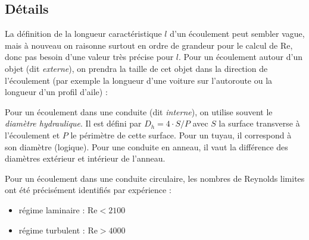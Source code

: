 \subsection{Détails}\label{sec:Re_details}
La définition de la longueur caractéristique $l$ d'un écoulement peut sembler vague, mais à nouveau on raisonne surtout en ordre de grandeur pour le calcul de $\mathrm{Re}$, donc pas besoin d'une valeur très précise pour $l$. Pour un écoulement autour d'un objet (dit \textit{externe}), on prendra la taille de cet objet dans la direction de l'écoulement (par exemple la longueur d'une voiture sur l'autoroute ou la longueur d'un profil d'aile) :
%
\begin{center}
\end{center}
%
Pour un écoulement dans une conduite (dit \textit{interne}), on utilise souvent le \textit{diamètre hydraulique}. Il est défini par $D_h = 4 \cdot S/P$ avec $S$ la surface transverse à l'écoulement et $P$ le périmètre de cette surface. Pour un tuyau, il correspond à son diamètre (logique). Pour une conduite en anneau, il vaut la différence des diamètres extérieur et intérieur de l'anneau.

Pour un écoulement dans une conduite circulaire, les nombres de Reynolds limites ont été précisément identifiés par expérience :
\begin{itemize}
    \item régime laminaire : $\mathrm{Re} < \num{2100}$
    \item régime turbulent : $\mathrm{Re} > \num{4000}$
\end{itemize}

